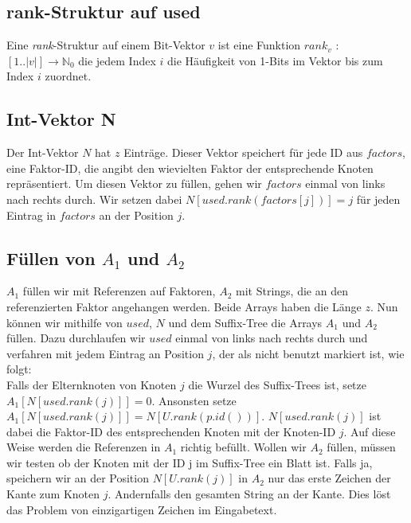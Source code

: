 \documentclass[a4paper,11pt]{scrartcl}%
\theoremstyle{change}
\theoremstyle{nonumberplain}
\theoremstyle{change}
\theoremstyle{nonumberplain}
\theoremstyle{change}
\theoremstyle{nonumberplain}
\begin{document}
\subsection{rank-Struktur auf used}

Eine \textit{rank}-Struktur auf einem Bit-Vektor $v$ ist eine Funktion $rank_v$ : $[1..|v|] \rightarrow \mathbb{N}_0$ die jedem Index $i$ die Häufigkeit von 1-Bits im Vektor bis zum Index $i$ zuordnet\cite[S. 39]{munroTables}.


\subsection{Int-Vektor N}

Der Int-Vektor $N$ hat $z$ Einträge. Dieser Vektor speichert für jede ID aus $factors$, eine Faktor-ID, die angibt den wievielten Faktor der entsprechende Knoten repräsentiert. Um diesen Vektor zu füllen, gehen wir $factors$ einmal von links nach rechts durch. Wir setzen dabei $N[used.rank(factors[j])] = j$ für jeden Eintrag in $factors$ an der Position $j$.
 


\subsection{Füllen von $A_1$ und $A_2$}\label{fill_arrays}

$A_1$ füllen wir mit Referenzen auf Faktoren, $A_2$ mit Strings, die an den referenzierten Faktor angehangen werden. Beide Arrays haben die Länge $z$.
Nun können wir mithilfe von $used$, $N$ und dem Suffix-Tree die Arrays $A_1$ und $A_2$ füllen. Dazu durchlaufen wir $used$ einmal von links nach rechts durch und verfahren mit jedem Eintrag an Position $j$, der als nicht benutzt markiert ist, wie folgt:\\
Falls der Elternknoten von Knoten $j$  die Wurzel des Suffix-Trees ist, setze \\$A_1[N[used.rank(j)]] = 0$. Ansonsten setze $A_1[N[used.rank(j)]] = N[U.rank(p.id())]$.
$N[used.rank(j)]$ ist dabei die Faktor-ID des entsprechenden Knoten mit der Knoten-ID $j$. 
Auf diese Weise werden die Referenzen in $A_1$ richtig befüllt. Wollen wir $A_2$ füllen, müssen wir testen ob der Knoten mit der ID j im Suffix-Tree ein Blatt ist. Falls ja, speichern wir an der Position $N[U.rank(j)]$ in $A_2$ nur das erste Zeichen der Kante zum Knoten $j$. Andernfalls den gesamten String an der Kante. Dies löst das Problem von einzigartigen Zeichen im Eingabetext.
\end{document}
